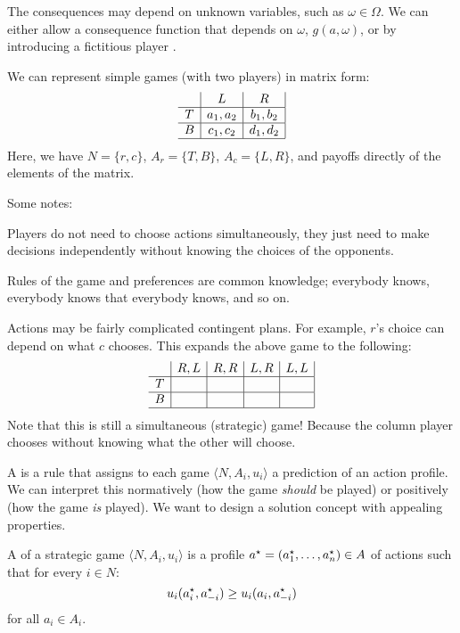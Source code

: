 \documentclass[10pt]{article}
\begin{document}
The consequences may depend on unknown variables, such as $\omega \in \Omega$. We can either allow a consequence function that depends on $\omega$, $g(a,\omega)$, or by introducing a fictitious player .

We can represent simple games (with two players) in matrix form:
\[
\begin{array}{c|c|c|}
	& L & R \\
	\hline 
	T & a_1,a_2 & b_1,b_2 \\
	\hline
	B & c_1,c_2 & d_1,d_2 \\\hline
\end{array}
\]
Here, we have $N = \{r,c\}$, $A_r = \{T,B\}$, $A_c = \{L,R\}$, and payoffs directly of the elements of the matrix. 

Some notes:

\begin{remark}
	Players do not need to choose actions simultaneously, they just need to make decisions independently without knowing the choices of the opponents.
\end{remark}
\begin{remark}
	Rules of the game and preferences are common knowledge; everybody knows, everybody knows that everybody knows, and so on.
\end{remark}
\begin{remark}
	Actions may be fairly complicated contingent plans. For example, $r$'s choice can depend on what $c$ chooses. This expands the above game to the following:
	\[
	\begin{array}{c|c|c|c|c|}
	& R,L & R,R & L,R & L,L \\
	\hline 
	T & &&& \\
	\hline
	B &&&& \\\hline
\end{array}
	\]
	Note that this is still a simultaneous (strategic) game! Because the column player chooses without knowing what the other will choose.
\end{remark}


\begin{definition}
	A  is a rule that assigns to each game $\langle N, A_i, u_i\rangle$ a prediction of an action profile. We can interpret this normatively (how the game \emph{should} be played) or positively (how the game \emph{is} played). We want to design a solution concept with appealing properties.
\end{definition}


\begin{definition}
	A  of a strategic game $\langle N,A_i,u_i\rangle$ is a profile $a^\star = (a_1^\star,\dots,a_n^\star) \in A$ of actions such that for every $i \in N$:
	\[
	u_i(a^\star_i,a^\star_{-i}) \ge u_i(a_i,a^\star_{-i})
	\]
	for all $a_i \in A_i$.
\end{definition}
\end{document}

